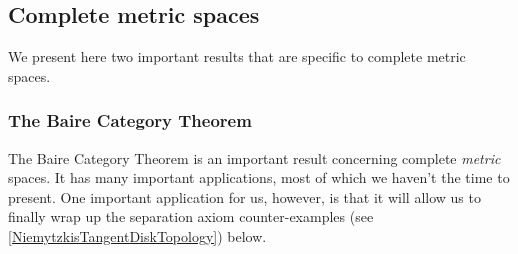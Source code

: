\subsection{Complete metric spaces}

We present here two important results that are specific to complete metric spaces.

\subsubsection{The Baire Category Theorem}

The Baire Category Theorem is an important result concerning complete \emph{metric} spaces.  It has many important applications, most of which we haven't the time to present.  One important application for us, however, is that it will allow us to finally wrap up the separation axiom counter-examples (see \cref{NiemytzkisTangentDiskTopology}) below.
